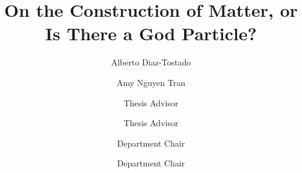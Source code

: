\documentclass{scu-thesis}
\author{Alberto Diaz-Tostado}
\author{Amy Nguyen Tran}
\title{On the Construction of Matter, or Is There a God Particle?}
\begin{document}
\frontmatter
\signature{Thesis Advisor}
\signature{Thesis Advisor}
\signature{Department Chair}
\signature{Department Chair}

\maketitle


\tableofcontents
\listoffigures

\mainmatter


\backmatter
\end{document}
